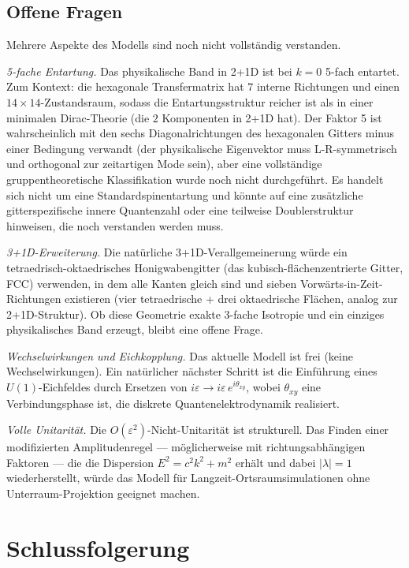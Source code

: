 \documentclass[twocolumn,showpacs,preprintnumbers,amsmath,amssymb]{revtex4-2}
\newcommand{\eps}{\varepsilon}
\begin{document}
\subsection{Offene Fragen}

Mehrere Aspekte des Modells sind noch nicht vollständig verstanden.

\emph{5-fache Entartung.}
Das physikalische Band in 2+1D ist bei $k=0$ 5-fach entartet.
Zum Kontext: die hexagonale Transfermatrix hat $7$ interne Richtungen und einen
$14\times14$-Zustandsraum, sodass die Entartungsstruktur reicher ist als in
einer minimalen Dirac-Theorie (die $2$ Komponenten in 2+1D hat).
Der Faktor 5 ist wahrscheinlich mit den sechs Diagonalrichtungen des hexagonalen
Gitters minus einer Bedingung verwandt (der physikalische Eigenvektor muss
L-R-symmetrisch und orthogonal zur zeitartigen Mode sein), aber eine vollständige
gruppentheoretische Klassifikation wurde noch nicht durchgeführt.
Es handelt sich nicht um eine Standardspinentartung und könnte auf eine
zusätzliche gitterspezifische innere Quantenzahl oder eine teilweise
Doublerstruktur hinweisen, die noch verstanden werden muss.

\emph{3+1D-Erweiterung.}
Die natürliche 3+1D-Verallgemeinerung würde ein tetraedrisch-oktaedrisches
Honigwabengitter (das kubisch-flächenzentrierte Gitter, FCC) verwenden, in dem
alle Kanten gleich sind und sieben Vorwärts-in-Zeit-Richtungen existieren
(vier tetraedrische + drei oktaedrische Flächen, analog zur 2+1D-Struktur).
Ob diese Geometrie exakte 3-fache Isotropie und ein einziges physikalisches
Band erzeugt, bleibt eine offene Frage.

\emph{Wechselwirkungen und Eichkopplung.}
Das aktuelle Modell ist frei (keine Wechselwirkungen).
Ein natürlicher nächster Schritt ist die Einführung eines $U(1)$-Eichfeldes
durch Ersetzen von $i\eps \to i\eps\, e^{i\theta_{xy}}$, wobei $\theta_{xy}$
eine Verbindungsphase ist, die diskrete Quantenelektrodynamik realisiert.

\emph{Volle Unitarität.}
Die $O(\eps^2)$-Nicht-Unitarität ist strukturell.
Das Finden einer modifizierten Amplitudenregel --- möglicherweise mit
richtungsabhängigen Faktoren --- die die Dispersion $E^2 = c^2k^2 + m^2$
erhält und dabei $|\lambda| = 1$ wiederherstellt, würde das Modell für
Langzeit-Ortsraumsimulationen ohne Unterraum-Projektion geeignet machen.

\section{Schlussfolgerung}
\label{sec:conclusion}
\end{document}
